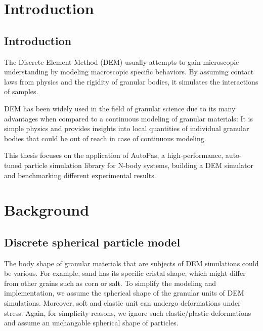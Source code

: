 \documentclass[11pt,
               a4paper,
               bibtotoc,
               idxtotoc,
               headsepline,
               footsepline,
               footexclude,
               BCOR12mm,
               DIV13,
               openany,   %
               ]
               {scrbook}
\begin{document}
\lipsum[2]

\cleardoublepage


\tableofcontents
\thispagestyle{empty}
\cleardoubleemptypage


\mainmatter
\part{Introduction}
\chapter{Introduction}
\label{sec:introduction}
The Discrete Element Method (DEM) usually attempts to gain microscopic understanding by modeling macroscopic specific behaviors. By assuming contact laws from physics and the rigidity of granular bodies, it simulates the interactions of samples. 

DEM has been widely used in the field of granular science due to its many advantages  when compared to a continuous modeling of granular materials: It is simple physics and provides insights into local quantities of individual granular bodies that could be out of reach in case of continuous modeling.

This thesis focuses on the application of AutoPas, a high-performance, auto-tuned particle simulation library for N-body systems, building a DEM simulator and benchmarking different experimental results.

\part{Background}
\chapter{Discrete spherical particle model}
\label{sec:discrete_spherical_particle_model}

The body shape of granular materials that are subjects of DEM simulations could be various. For example, sand has its specific cristal shape, which might differ from other grains such as corn or salt. 
To simplify the modeling and implementation, we assume the spherical shape of the granular units of DEM simulations.
Moreover, soft and elastic unit can undergo deformations under stress. Again, for simplicity reasons, we ignore such elastic/plastic deformations and assume an unchangable spherical shape of particles.
\end{document}
